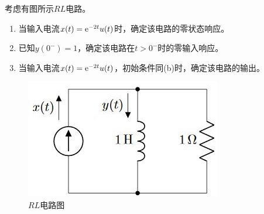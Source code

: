 \begin{proposition}

        考虑有图所示$RL$电路。

        \begin{enumerate}

            \item 当输入电流$x(t) = \mathrm{e}^{-2t}u(t)$时，确定该电路的零状态响应。
            \item 已知$y(0^{-}) = 1$，确定该电路在$t > 0^{-}$时的零输入响应。
            \item 当输入电流$x(t) =  \mathrm{e}^{-2t}u(t)$，初始条件同\textup{(b)}时，确定该电路的输出。
            
        \end{enumerate}

    \begin{figure}[H]

        \centering
        \includegraphics[scale=0.8]{RL.JPG}
        \caption{$RL$电路图}

    \end{figure}

\end{proposition}

